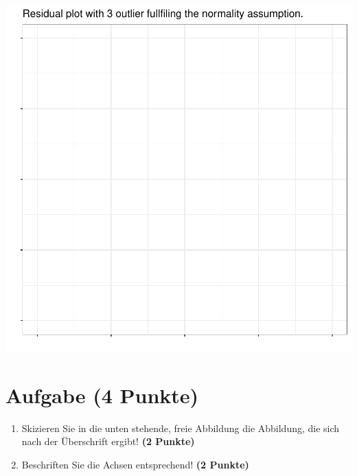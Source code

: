 \documentclass[a4paper, 10pt]{scrartcl}\usepackage[]{graphicx}\usepackage[]{xcolor}
\makeatletter
\def\maxwidth{ %
  \ifdim\Gin@nat@width>\linewidth
    \linewidth
  \else
    \Gin@nat@width
  \fi
}
\makeatother
\begin{document}
{\centering \includegraphics[width=\maxwidth]{img/regression-03-1} 

}



 
\clearpage

\section{Aufgabe \hfill (4 Punkte)}



\begin{enumerate}
\item Skizieren Sie in die unten stehende, freie Abbildung die
  Abbildung, die sich nach der {\"U}berschrift ergibt! \textbf{(2 Punkte)}
\item Beschriften Sie die Achsen entsprechend! \textbf{(2 Punkte)}
\end{enumerate}
\end{document}

